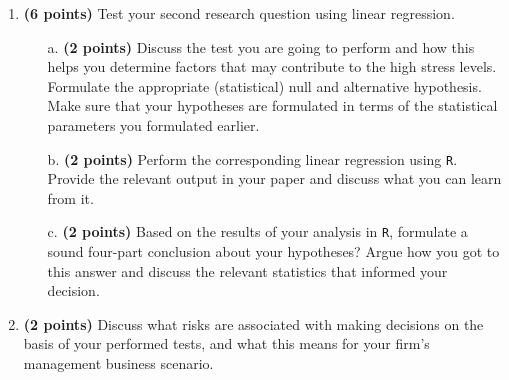 {\begin{enumerate}
    \begin{itemize}
        \item[a.] \textbf{(2 points)} Discuss the test you are going to perform and how this helps you determine factors that may contribute to the high stress levels. Formulate the appropriate (statistical) null and alternative hypothesis. Make sure that your hypotheses are formulated in terms of the statistical parameters you formulated earlier. 
        \item[b.] \textbf{(2 points)} Calculate the corresponding test statistic (e.g., $t$, $z$, $F$, $X^2$) from your data using the formulas learned in this course. Include the full calculation (including filled in formulas) in your report. You may use \texttt{R} to perform the calculations.
        \item[c.] \textbf{(2 points)} Define the critical area for your test statistic using the formulas learned in this course. Based on your previous calculations, draw a sound four-part conclusion. Argue how you got to this answer.
    \end{itemize}
    \item \textbf{(6 points)} Test your second research question using linear regression.
    \begin{itemize}
        \item[a.] \textbf{(2 points)} Discuss the test you are going to perform and how this helps you determine factors that may contribute to the high stress levels. Formulate the appropriate (statistical) null and alternative hypothesis. Make sure that your hypotheses are formulated in terms of the statistical parameters you formulated earlier.
        \item[b.] \textbf{(2 points)} Perform the corresponding linear regression using \texttt{R}. Provide the relevant output in your paper and discuss what you can learn from it. 
        \item[c.] \textbf{(2 points)} Based on the results of your analysis in \texttt{R}, formulate a sound four-part conclusion about your hypotheses? Argue how you got to this answer and discuss the relevant statistics that informed your decision. 
    \end{itemize}
    \item \textbf{(2 points)} Discuss what risks are associated with making decisions on the basis of your performed tests, and what this means for your firm’s management business scenario.
\end{enumerate}

}
\clearpage %
